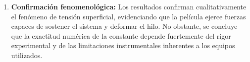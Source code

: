 \begin{enumerate}
    \item \textbf{Confirmación fenomenológica:} Los resultados confirman 
    cualitativamente el fenómeno de tensión superficial, evidenciando que 
    la película ejerce fuerzas capaces de sostener el sistema y deformar el hilo. 
    No obstante, se concluye que la exactitud numérica de la constante depende 
    fuertemente del rigor experimental y de las limitaciones instrumentales 
    inherentes a los equipos utilizados.

\end{enumerate}